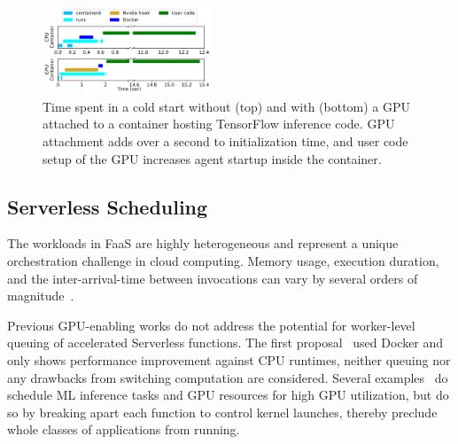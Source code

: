 \begin{figure}
  \includegraphics[width=0.45\textwidth]{../graphs/coldstart/combined_timeline.pdf}
  \vspace*{-0.35cm}
  \caption{Time spent in a cold start without (top) and with (bottom) a GPU attached to a container hosting TensorFlow inference code.
          GPU attachment adds over a second to initialization time, 
          and user code setup of the GPU increases agent startup inside the container. 
          }
    \label{fig:cold-timeline}
\vspace*{-0.6cm}
\end{figure}

\subsection{Serverless Scheduling}

The workloads in FaaS are highly heterogeneous and represent a unique orchestration challenge in cloud computing.
Memory usage, execution duration, and the inter-arrival-time between invocations can vary by several orders of magnitude~\cite{shahrad2020serverless}.


Previous GPU-enabling works do not address the potential for worker-level queuing of accelerated Serverless functions.
The first proposal~\cite{naranjo2020accelerated} used Docker and only shows performance improvement against CPU runtimes, neither queuing nor any drawbacks from switching computation are considered. 
Several examples~\cite{pemberton2022kernel,gu2023fast,ng2023paella} do schedule ML inference tasks and GPU resources for high GPU utilization, but do so by breaking apart each function to control kernel launches, thereby preclude whole classes of applications from running.

